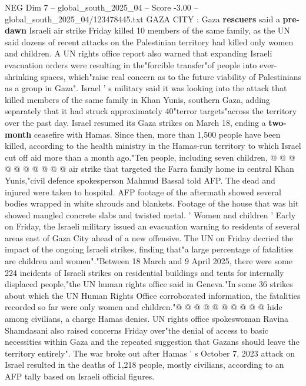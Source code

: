 \begin{textsample}{NEG Dim 7 – global\_south\_2025\_04 – Score -3.00 – global\_south\_2025\_04/123478445.txt}  \label{ex:f7_neg_042}
GAZA CITY : Gaza \textbf{rescuers} said a \textbf{pre-dawn} Israeli air strike Friday killed 10 members of the same family, as the UN said dozens of recent attacks on the Palestinian territory had killed only women and children.
A UN rights office report also warned that expanding Israeli evacuation orders were resulting in the"forcible transfer"of people into ever-shrinking spaces, which"raise real concern as to the future viability of Palestinians as a group in Gaza".
Israel ' s military said it was looking into the attack that killed members of the same family in Khan Yunis, southern Gaza, adding separately that it had struck approximately 40"terror targets"across the territory over the past day.
Israel resumed its Gaza strikes on March 18, ending a \textbf{two-month} ceasefire with Hamas.
Since then, more than 1,500 people have been killed, according to the health ministry in the Hamas-run territory to which Israel cut off aid more than a month ago."Ten people, including seven children, @ @ @ @ @ @ @ @ @ @ air strike that targeted the Farra family home in central Khan Yunis,"civil defence spokesperson Mahmud Bassal told AFP.
The dead and injured were taken to hospital.
AFP footage of the aftermath showed several bodies wrapped in white shrouds and blankets.
Footage of the house that was hit showed mangled concrete slabs and twisted metal. ' Women and children ' Early on Friday, the Israeli military issued an evacuation warning to residents of several areas east of Gaza City ahead of a new offensive.
The UN on Friday decried the impact of the ongoing Israeli strikes, finding that"a large percentage of fatalities are children and women"."Between 18 March and 9 April 2025, there were some 224 incidents of Israeli strikes on residential buildings and tents for internally displaced people,"the UN human rights office said in Geneva."In some 36 strikes about which the UN Human Rights Office corroborated information, the fatalities recorded so far were only women and children."@ @ @ @ @ @ @ @ @ @ hide among civilians, a charge Hamas denies.
UN rights office spokeswoman Ravina Shamdasani also raised concerns Friday over"the denial of access to basic necessities within Gaza and the repeated suggestion that Gazans should leave the territory entirely".
The war broke out after Hamas ' s October 7, 2023 attack on Israel resulted in the deaths of 1,218 people, mostly civilians, according to an AFP tally based on Israeli official figures.

\end{textsample}
